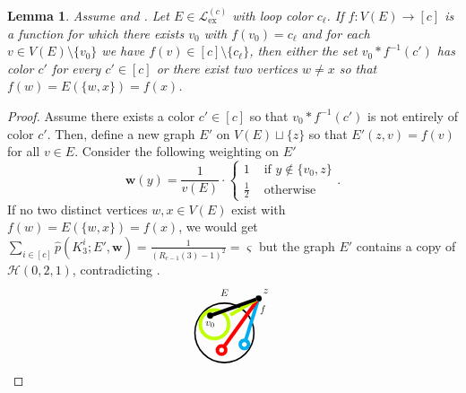 \documentclass[a4paper,11pt]{article}
\newtheorem{lemma}[theorem]{Lemma}
\numberwithin{equation}{section}
\newcommand{\mL}{\mathcal{L}}
\newcommand{\mH}{\mathcal{H}}
\newcommand{\boxedchar}[1]{
    \hspace{-2pt}\tikz[baseline=(char.base)]{
        \node[shape=rectangle, fill=black, rounded corners=1.5pt, text=white, inner xsep=3pt, inner xsep=3pt, inner ysep=2pt] (char) {\normalfont #1};
    }\hspace{-2pt}
}
\begin{document}
\begin{lemma}\label{lem:two_disjoint_monochrom}
     Assume \boxedchar{A1} and \boxedchar{A2}. Let $E \in \mL_{\operatorname{ex}}^{(c)}$ with loop color $c_\ell$. If $f:V(E)\to [c]$ is a function for which there exists $v_0$ with $f(v_0)=c_\ell$ and for each $v\in V(E)\setminus \{v_0\}$ we have
    $f(v)\in [c]\setminus \{c_\ell\}$, then either the set $v_0\ast f^{-1}(c')$ has color $c'$ for every $c'\in[c]$ or there exist two vertices $w\ne x$ so that $f(w)=E(\{w,x\})=f(x)$.
\end{lemma}
\begin{proof}
    Assume there exists a color $c'\in [c]$ so that $v_0\ast f^{-1}(c')$ is not entirely of color $c'$. Then, define a new graph $E'$ on $V(E)\sqcup \{z\}$ so that $E'(z,v) = f(v)$ for all $v\in E$. Consider the following weighting on $E'$ 
    \begin{equation}\label{eq:weighting_on_extension}
        \mathbf w(y) = \frac{1}{v(E)}\cdot
        \begin{cases}
            1 & \text{ if }y\not\in\{v_0,z\} \\
            \frac{1}{2} & \text{ otherwise }
        \end{cases}.
    \end{equation}
    If no two distinct vertices $w,x\in V(E)$ exist with $f(w) = E(\{w,x\}) = f(x)$, we would get $\sum_{i\in [c]} \hat p(K^i_3; E', \mathbf w) = \frac{1}{(R_{c-1}(3)-1)^2} = \varsigma$ but the graph $E'$ contains a copy of $\mH(0,2,1)$, contradicting \boxedchar{A2}.
    $$  
    \begin{tikzpicture}[line width=0.4mm,baseline=0ex, scale=0.8]
        \node[circle,black,draw,scale=5] (A) at (0,0) {};
        \node[circle,lime,draw,scale=2.4, line width=1mm] (B1) at (-0.35,0.3) {};
        \node[circle,red,draw,scale=0.7, line width=1mm] (B2) at (-0.1,-0.6) {};
        \node[circle,cyan,draw,scale=0.7, line width=1mm] (B3) at (0.7,-0.4) {};
        \node[circle,fill=black,draw,scale=0.4] (P) at (1.2,1.2) {};
        \node[circle,fill=black,draw,scale=0.4] (Q1) at (-0.5,0.6) {};

        \draw[cyan, line width=1mm] (P) -- (B3);
        \draw[red, line width=1mm] (P) -- (B2);
        \draw[lime, line width=1mm] (P) -- (B1);

        \draw[black, line width=1mm] (Q1) -- (P);

        \node[scale=0.8] at (0,1.4) {$E$};
        \node[scale=0.8] at (1.45,1.45) {$z$};
        \node[scale=0.8] at (1.35,0.8) {$f$};
        \node[scale=0.8] at (-0.5,0.3) {$v_0$};
    \end{tikzpicture}   
    $$
\end{proof}
\end{document}
